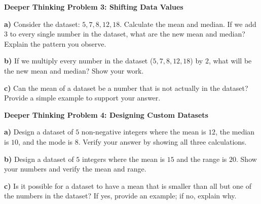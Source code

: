 \documentclass[12pt, letterpaper, fleqn]{article}
\begin{document}
\begin{tcolorbox}[colback=white, colframe=black, boxrule=1pt, arc=4mm, left=6mm, right=6mm, top=5mm, bottom=5mm]
\textbf{Deeper Thinking Problem 3: Shifting Data Values}

\medskip

\noindent
\textbf{a)} Consider the dataset: $5, 7, 8, 12, 18$. Calculate the mean and median. If we add $3$ to every single number in the dataset, what are the new mean and median? Explain the pattern you observe.

\vspace{5cm}

\noindent
\textbf{b)} If we multiply every number in the dataset ($5, 7, 8, 12, 18$) by $2$, what will be the new mean and median? Show your work.

\vspace{5cm}

\noindent
\textbf{c)} Can the mean of a dataset be a number that is not actually in the dataset? Provide a simple example to support your answer.

\vspace{5cm}
\end{tcolorbox}
\newpage

\begin{tcolorbox}[colback=white, colframe=black, boxrule=1pt, arc=4mm, left=6mm, right=6mm, top=5mm, bottom=5mm]
\textbf{Deeper Thinking Problem 4: Designing Custom Datasets}

\medskip

\noindent
\textbf{a)} Design a dataset of $5$ non-negative integers where the mean is $12$, the median is $10$, and the mode is $8$. Verify your answer by showing all three calculations.

\vspace{5cm}

\noindent
\textbf{b)} Design a dataset of $5$ integers where the mean is $15$ and the range is $20$. Show your numbers and verify the mean and range.

\vspace{5cm}

\noindent
\textbf{c)} Is it possible for a dataset to have a mean that is smaller than all but one of the numbers in the dataset? If yes, provide an example; if no, explain why.

\vspace{5cm}
\end{tcolorbox}
\end{document}
